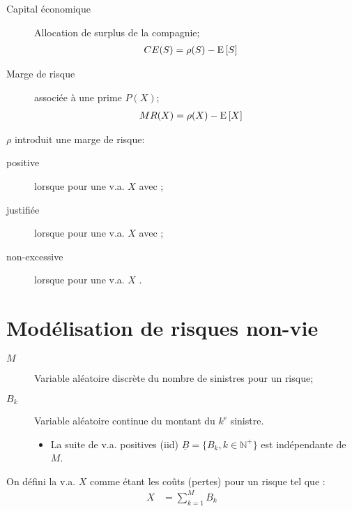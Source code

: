 \documentclass[10pt, french]{article}
\begin{document}
\begin{multicols*}{2}
\begin{description}
	\item[Capital économique]	Allocation de surplus de la compagnie;
		\begin{align*}
		CE(S)	
		&=	\rho(S)	-	\mathrm{E} \left[ S \right]
		\end{align*}
	\item[Marge de risque]	associée à une prime $P(X)$;
		\begin{align*}
		MR(X)
		&=	\rho(X)	-	\mathrm{E} \left[ X \right]
		\end{align*}
\end{description}

$\rho$ introduit une marge de risque:
\begin{description}
	\item[positive]	lorsque  pour une v.a. $X$ avec ;
	\item[justifiée]	lorsque  pour une v.a. $X$ avec ;
	\item[non-excessive]	lorsque  pour une v.a. $X$  .
\end{description}

\pagebreak
\section{Modélisation de risques non-vie}
\begin{distributions}[Notation]
\begin{description}
	\item[$M$]	Variable aléatoire discrète du nombre de sinistres pour un risque;
	\item[$B_{k}$]	Variable aléatoire continue du montant du $k^{\text{e}}$ sinistre.
		\begin{itemize}
		\item	La suite de v.a. positives (iid) $\underline{B}	=	\{B_{k}, k \in \mathbb{N}^{+}\}$ est indépendante de $M$.
		\end{itemize}
\end{description}
\end{distributions}

\begin{definitionNOHFILL}
On défini la v.a. $X$ comme étant les coûts (pertes) pour un risque tel que :
\begin{align*}
	X
	&=	\sum_{k	=	1}^{M} B_{k}
\end{align*}


\end{definitionNOHFILL}
\end{multicols*}
\end{document}
